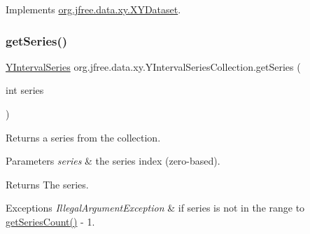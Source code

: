 Implements \mbox{\hyperlink{interfaceorg_1_1jfree_1_1data_1_1xy_1_1_x_y_dataset_ae81f9de91dfcae45028fc8a486a119da}{org.\+jfree.\+data.\+xy.\+X\+Y\+Dataset}}.

\mbox{\label{classorg_1_1jfree_1_1data_1_1xy_1_1_y_interval_series_collection_a4962eaf5aaf01293c6edb45121eddc4d}} 
\subsubsection{\texorpdfstring{get\+Series()}{getSeries()}}
{\footnotesize\ttfamily \mbox{\hyperlink{classorg_1_1jfree_1_1data_1_1xy_1_1_y_interval_series}{Y\+Interval\+Series}} org.\+jfree.\+data.\+xy.\+Y\+Interval\+Series\+Collection.\+get\+Series (\begin{DoxyParamCaption}\item[{int}]{series }\end{DoxyParamCaption})}

Returns a series from the collection.


\begin{DoxyParams}{Parameters}
{\em series} & the series index (zero-\/based).\\
\hline
\end{DoxyParams}
\begin{DoxyReturn}{Returns}
The series.
\end{DoxyReturn}

\begin{DoxyExceptions}{Exceptions}
{\em Illegal\+Argument\+Exception} & if {\ttfamily series} is not in the range {} to {\ttfamily \mbox{\hyperlink{classorg_1_1jfree_1_1data_1_1xy_1_1_y_interval_series_collection_ac7e43d8de0b3233231f55f21f865e242}{get\+Series\+Count()}} -\/ 1}. \\
\hline
\end{DoxyExceptions}
\mbox{\label{classorg_1_1jfree_1_1data_1_1xy_1_1_y_interval_series_collection_ac7e43d8de0b3233231f55f21f865e242}} 
